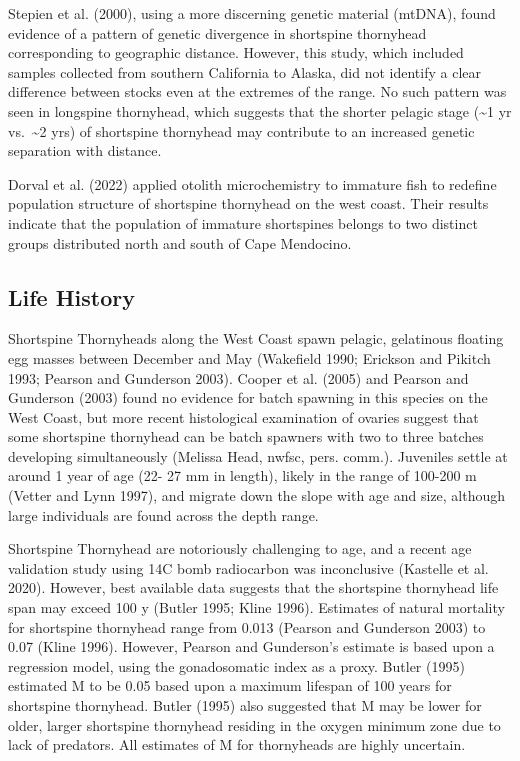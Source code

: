 \documentclass[11pt,
  english,
  letterpaper,
]{article}
\begin{document}
Stepien et al. (2000), using a more discerning genetic material (mtDNA), found evidence of a pattern of genetic divergence in shortspine thornyhead corresponding to geographic distance. However, this study, which included samples collected from southern California to Alaska, did not identify a clear difference between stocks even at the extremes of the range. No such pattern was seen in longspine thornyhead, which suggests that the shorter pelagic stage (\textasciitilde1 yr vs.~\textasciitilde2 yrs) of shortspine thornyhead may contribute to an increased genetic separation with distance.

Dorval et al. (2022) applied otolith microchemistry to immature fish to redefine population structure of shortspine thornyhead on the west coast. Their results indicate that the population of immature shortspines belongs to two distinct groups distributed north and south of Cape Mendocino.

\hypertarget{life-history}{%
\subsection{Life History}\label{life-history}}

Shortspine Thornyheads along the West Coast spawn pelagic, gelatinous floating egg masses between December and May (Wakefield 1990; Erickson and Pikitch 1993; Pearson and Gunderson 2003). Cooper et al. (2005) and Pearson and Gunderson (2003) found no evidence for batch spawning in this species on the West Coast, but more recent histological examination of ovaries suggest that some shortspine thornyhead can be batch spawners with two to three batches developing simultaneously (Melissa Head, \gls{nwfsc}, pers. comm.). Juveniles settle at around 1 year of age (22- 27 mm in length), likely in the range of 100-200 m (Vetter and Lynn 1997), and migrate down the slope with age and size, although large individuals are found across the depth range.

Shortspine Thornyhead are notoriously challenging to age, and a recent age validation study using 14C bomb radiocarbon was inconclusive (Kastelle et al. 2020). However, best available data suggests that the shortspine thornyhead life span may exceed 100 y (Butler 1995; Kline 1996). Estimates of natural mortality for shortspine thornyhead range from 0.013 (Pearson and Gunderson 2003) to 0.07 (Kline 1996). However, Pearson and Gunderson's estimate is based upon a regression model, using the gonadosomatic index as a proxy. Butler (1995) estimated M to be 0.05 based upon a maximum lifespan of 100 years for shortspine thornyhead. Butler (1995) also suggested that M may be lower for older, larger shortspine thornyhead residing in the oxygen minimum zone due to lack of predators. All estimates of M for thornyheads are highly uncertain.
\end{document}
